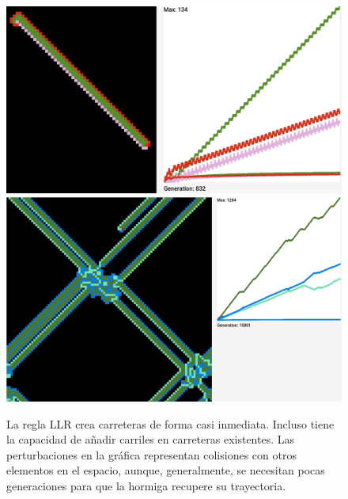 \documentclass[12pt,twoside]{article}
\begin{document}
\begin{figure}[h!]
	\centering
	\begin{minipage}{0.45\textwidth}
		\centering
		\includegraphics[width=\textwidth]{img/llr1.png}
	\end{minipage}%
	\hspace{0.5cm}%
	\begin{minipage}{0.45\textwidth}
		\centering
		\includegraphics[width=\textwidth]{img/llr2.png}
	\end{minipage}
	\vspace{0.3cm}
	
	\begin{minipage}{0.9\textwidth}
		\centering
		\small La regla LLR crea carreteras de forma casi inmediata. Incluso tiene la capacidad de añadir carriles en carreteras existentes. Las perturbaciones en la gráfica representan colisiones con otros elementos en el espacio, aunque, generalmente, se necesitan pocas generaciones para que la hormiga recupere su trayectoria.
	\end{minipage}
	\vspace{0.5cm}
	

\end{figure}
\end{document}
